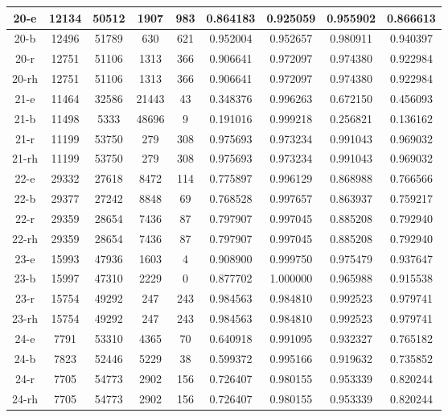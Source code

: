 \begin{longtable}[!h]{|c|c|c|c|c|c|c|c|c|}
	\hline \rowcolor{bad}	20-e	&	12134	&	50512	&	1907	&	983	&	0.864183	&	0.925059	&	0.955902	&	0.866613	\\
	\hline \rowcolor{closest}	20-b	&	12496	&	51789	&	630	&	621	&	0.952004	&	0.952657	&	0.980911	&	0.940397	\\
	\hline	20-r	&	12751	&	51106	&	1313	&	366	&	0.906641	&	0.972097	&	0.974380	&	0.922984	\\
	\hline	20-rh	&	12751	&	51106	&	1313	&	366	&	0.906641	&	0.972097	&	0.974380	&	0.922984	\\
	
	\hline	21-e	&	11464	&	32586	&	21443	&	43	&	0.348376	&	0.996263	&	0.672150	&	0.456093	\\
	\hline \rowcolor{bad}	21-b	&	11498	&	5333	&	48696	&	9	&	0.191016	&	0.999218	&	0.256821	&	0.136162	\\
	\hline \rowcolor{closest}	21-r	&	11199	&	53750	&	279	&	308	&	0.975693	&	0.973234	&	0.991043	&	0.969032	\\
	\hline \rowcolor{closest}	21-rh	&	11199	&	53750	&	279	&	308	&	0.975693	&	0.973234	&	0.991043	&	0.969032	\\
	
	\hline	22-e	&	29332	&	27618	&	8472	&	114	&	0.775897	&	0.996129	&	0.868988	&	0.766566	\\
	\hline \rowcolor{bad}	22-b	&	29377	&	27242	&	8848	&	69	&	0.768528	&	0.997657	&	0.863937	&	0.759217	\\
	\hline \rowcolor{closest}	22-r	&	29359	&	28654	&	7436	&	87	&	0.797907	&	0.997045	&	0.885208	&	0.792940	\\
	\hline \rowcolor{closest}	22-rh	&	29359	&	28654	&	7436	&	87	&	0.797907	&	0.997045	&	0.885208	&	0.792940	\\
	
	\hline	23-e	&	15993	&	47936	&	1603	&	4	&	0.908900	&	0.999750	&	0.975479	&	0.937647	\\
	\hline \rowcolor{bad}	23-b	&	15997	&	47310	&	2229	&	0	&	0.877702	&	1.000000	&	0.965988	&	0.915538	\\
	\hline \rowcolor{closest}	23-r	&	15754	&	49292	&	247	&	243	&	0.984563	&	0.984810	&	0.992523	&	0.979741	\\
	\hline \rowcolor{closest}	23-rh	&	15754	&	49292	&	247	&	243	&	0.984563	&	0.984810	&	0.992523	&	0.979741	\\
	
	\hline	24-e	&	7791	&	53310	&	4365	&	70	&	0.640918	&	0.991095	&	0.932327	&	0.765182	\\
	\hline \rowcolor{bad}	24-b	&	7823	&	52446	&	5229	&	38	&	0.599372	&	0.995166	&	0.919632	&	0.735852	\\
	\hline \rowcolor{closest}	24-r	&	7705	&	54773	&	2902	&	156	&	0.726407	&	0.980155	&	0.953339	&	0.820244	\\
	\hline \rowcolor{closest}	24-rh	&	7705	&	54773	&	2902	&	156	&	0.726407	&	0.980155	&	0.953339	&	0.820244	\\
	

\end{longtable}
